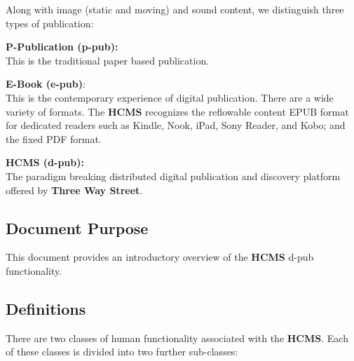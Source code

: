 \documentclass[12pt]{article}
\begin{document}
Along with image (static and moving) and sound content, we distinguish three types of publication:
\begin{description}
\item {\bf P-Publication (p-pub):}\\
This is the traditional paper based publication.
\item {\bf E-Book (e-pub)}:\\
This is the contemporary experience of digital publication. There are a wide variety of formats. The {\bf \small HCMS} recognizes the reflowable content EPUB format for dedicated readers such as Kindle, Nook, iPad, Sony Reader, and Kobo; and the fixed PDF format.
\item {\bf HCMS (d-pub):}\\
The paradigm breaking distributed digital publication and discovery platform offered by {\bf \small Three Way Street}.
\end{description}

\subsection{Document Purpose}

This document provides an introductory overview of the {\bf \small HCMS} d-pub functionality.

\subsection{Definitions}

There are two classes of human functionality associated with the {\bf \small HCMS}. Each of these classes is divided into two further sub-classes:
\end{document}
